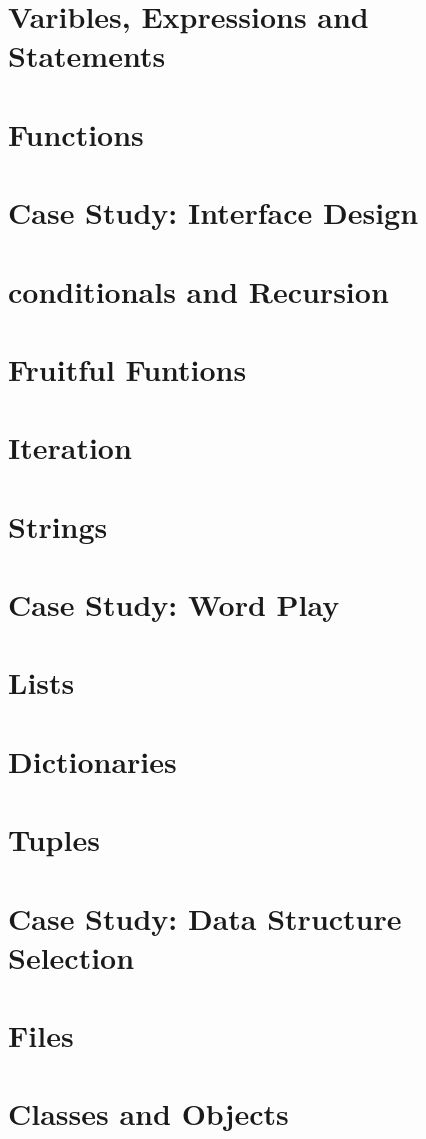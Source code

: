 \documentclass[a4paper,11pt]{book}
\begin{document}
\chapter{Varibles, Expressions and Statements}
\chapter{Functions}
\chapter{Case Study: Interface Design}
\chapter{conditionals and Recursion}
\chapter{Fruitful Funtions}
\chapter{Iteration}
\chapter{Strings}
\chapter{Case Study: Word Play}
\chapter{Lists}
\chapter{Dictionaries}
\chapter{Tuples}
\chapter{Case Study: Data Structure Selection}
\chapter{Files}
\chapter{Classes and Objects}
\end{document}
